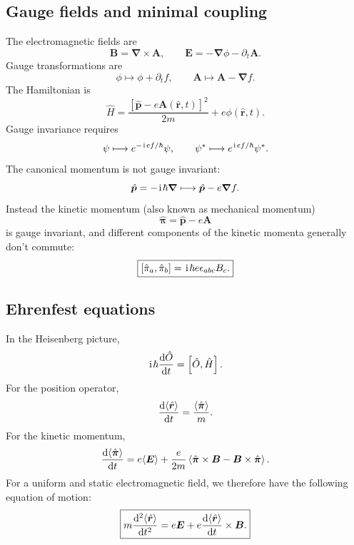 \subsection{Gauge fields and minimal coupling}
The electromagnetic fields are
\begin{equation}
\bm B=\bm\nabla\times\bm A,
\qquad
\bm E=-\bm\nabla\phi-\partial_t\bm A.
\end{equation}
Gauge transformations are
\begin{equation}
\phi\longmapsto\phi+\partial_t f,
\qquad
\bm A\longmapsto\bm A-\bm\nabla f.
\end{equation}
The Hamiltonian is
\begin{equation}
\boxed{
\hat H=\frac{[\hat{\bm p}-e\bm A(\hat{\bm r},t)]^2}{2m}
+e\phi(\hat{\bm r},t).}
\end{equation}
Gauge invariance requires
\begin{equation}
\psi\longmapsto e^{-\hspace{1pt}\mathrm{i}\hspace{1pt} ef/\hbar}\psi,
\qquad
\psi^*\longmapsto e^{\hspace{1pt}\mathrm{i}\hspace{1pt} ef/\hbar}\psi^*.
\end{equation}
The canonical momentum is not gauge invariant:
\begin{equation}
\hat{\bm p}=-\hspace{1pt}\mathrm{i}\hspace{1pt}\hbar\bm\nabla
\longmapsto\hat{\bm p}-e\bm\nabla f.
\end{equation}
Instead the kinetic momentum (also known as mechanical momentum)
\begin{equation}
\boxed{\hat{\bm\pi}=\hat{\bm p}-e\bm A}
\end{equation}
is gauge invariant, and different components of the kinetic momenta generally don't commute:
\begin{equation}
\boxed{\left[\hat\pi_a,\hat\pi_b\right]
=\hspace{1pt}\mathrm{i}\hspace{1pt}\hbar e\epsilon_{abc}B_c.}
\end{equation}

\subsection{Ehrenfest equations}
In the Heisenberg picture,
\begin{equation}
\hspace{1pt}\mathrm{i}\hspace{1pt}\hbar\frac{\mathrm{d}\hat O}{\mathrm{d} t}=\left[\hat O,\hat H\right].
\end{equation}
For the position operator,
\begin{equation}
\frac{\mathrm{d}\langle\hat{\bm r}\rangle}{\mathrm{d} t}
=\frac{\langle\hat{\bm\pi}\rangle}{m}.
\end{equation}
For the kinetic momentum,
\begin{equation}
\frac{\mathrm{d}\langle\hat{\bm\pi}\rangle}{\mathrm{d} t}
=e\langle\bm E\rangle
+\frac{e}{2m}
\left\langle\hat{\bm\pi}\times\bm B
-\bm B\times\hat{\bm\pi}\right\rangle.
\end{equation}
For a uniform and static electromagnetic field, we therefore have the following equation of motion:
\begin{equation}
\boxed{
 m\frac{\mathrm{d}^2\langle\hat{\bm r}\rangle}{\mathrm{d} t^2}
=e\bm E+e\frac{\mathrm{d}\langle\hat{\bm r}\rangle}{\mathrm{d} t}
\times\bm B.}
\end{equation}

